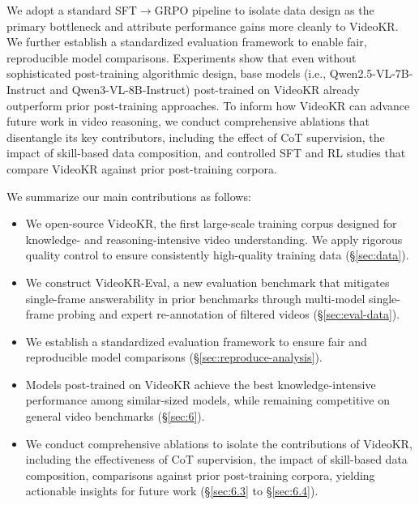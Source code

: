 \documentclass{llmxive}
\providecommand{\ie}{i.e.,\xspace}
\providecommand{\data}{VideoKR\xspace}
\providecommand{\eval}{VideoKR-Eval\xspace}
\providecommand{\ours}{VideoKR\xspace}
\begin{document}
We adopt a standard SFT$\rightarrow$GRPO pipeline to isolate data design as the primary bottleneck and attribute performance gains more cleanly to \ours. We further establish a standardized evaluation framework to enable fair, reproducible model comparisons. Experiments show that even without sophisticated post-training algorithmic design, base models (\ie Qwen2.5-VL-7B-Instruct and Qwen3-VL-8B-Instruct) post-trained on \ours already outperform prior post-training approaches.
To inform how \ours can advance future work in video reasoning, we conduct comprehensive ablations that disentangle its key contributors, including the effect of CoT supervision, the impact of skill-based data composition, and controlled SFT and RL studies that compare \ours against prior post-training corpora.

We summarize our main contributions as follows:

\begin{itemize} [leftmargin=*, itemsep=-0.15ex, topsep=-0.2ex]
\item We open-source \data, the first large-scale training corpus designed for knowledge- and reasoning-intensive video understanding. We apply rigorous quality control to ensure consistently high-quality training data (\S\ref{sec:data}).
\item We construct \eval, a new evaluation benchmark that mitigates single-frame answerability in prior benchmarks through multi-model single-frame probing and expert re-annotation of filtered videos (\S\ref{sec:eval-data}).
\item We establish a standardized evaluation framework to ensure fair and reproducible model comparisons (\S\ref{sec:reproduce-analysis}). 
\item Models post-trained on \ours achieve the best knowledge-intensive performance among similar-sized models, while remaining competitive on general video benchmarks (\S\ref{sec:6}).
\item We conduct comprehensive ablations to isolate the contributions of \ours, including the effectiveness of CoT supervision, the impact of skill-based data composition, comparisons against prior post-training corpora, yielding actionable insights for future work (\S\ref{sec:6.3} to \S\ref{sec:6.4}).
\end{itemize}
\end{document}
